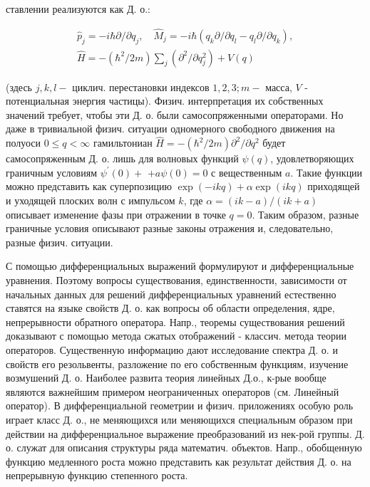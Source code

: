 \documentclass[10pt]{article}
\begin{document}
ставлении реализуются как Д. о.:



\[

\begin{gathered}

\hat{p}_{j}=-i \hbar \partial / \partial q_{j}, \quad \hat{M}_{j}=-i \hbar\left(q_{k} \partial / \partial q_{l}-q_{l} \partial / \partial q_{k}\right), \\

\hat{H}=-\left(\hbar^{2} / 2 m\right) \sum_{j}\left(\partial^{2} / \partial q_{j}^{2}\right)+V(q)

\end{gathered}

\]



(здесь $j, k, l-$ циклич. перестановки индексов $1,2,3 ; m-$ масса, $V$ - потенциальная энергия частицы). Физич. интерпретация их собственных значений требует, чтобы эти Д. о. были самосопряженными операторами. Но даже в тривиальной физич. ситуации одномерного свободного движения на полуоси $0 \leqslant q<\infty$ гамильтониан $\hat{H}=-\left(\hbar^{2} / 2 m\right) \partial^{2} / \partial q^{2}$ будет самосопряженным Д. о. лишь для волновых функций $\psi(q)$, удовлетворяющих граничным условиям $\psi^{\prime}(0)+$ $+a \psi(0)=0$ с вещественным $a$. Такие функции можно представить как суперпозицию $\exp (-i k q)+\alpha \exp (i k q)$ приходящей и уходящей плоских волн с импульсом $k$, где $\alpha=(i k-a) /(i k+a)$ описывает изменение фазы при отражении в точке $q=0$. Таким образом, разные граничные условия описывают разные законы отражения и, следовательно, разные физич. ситуации.



С помощью дифференциальных выражений формулируют и дифференциальные уравнения. Поэтому вопросы существования, единственности, зависимости от начальных данных для решений дифференциальных уравнений естественно ставятся на языке свойств Д. о. как вопросы об области определения, ядре, непрерывности обратного оператора. Напр., теоремы существования решений доказывают с помощью метода сжатых отображений - классич. метода теории операторов. Существенную информацию дают исследование спектра Д. о. и свойств его резольвенты, разложение по его собственным функциям, изучение возмушений Д. о. Наиболее развита теория линейных Д.о., к-рые вообще являются важнейшим примером неограниченных операторов (см. Линейный оператор). В дифференциальной геометрии и физич. приложениях особую роль играет класс Д. о., не меняющихся или меняющихся специальным образом при действии на дифференциальное выражение преобразований из нек-рой группы. Д. о. служат для описания структуры ряда математич. объектов. Напр., обобщенную функцию медленного роста можно представить как результат действия Д. о. на непрерывную функцию степенного роста.
\end{document}
